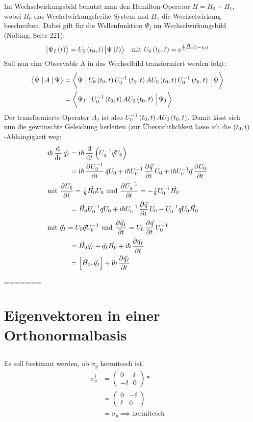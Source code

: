 Im Wechselwirkungsbild benutzt man den Hamilton-Operator $H=H_0+H_1$, wobei $H_0$ das Wechelwirkungsfreihe System und $H_1$ die Wechselwirkung beschreiben. Dabei gilt für die Wellenfunktion $\Psi_I$ im Wechselwirkungsbild (Nolting, Seite 221):
\begin{align*}
	\ket{\Psi_I\del{t}}=U_0\del{t_0,t}\ket{\Psi\del{t}}&&\text{mit }U_0\del{t_0,t}=\ee^{\frac{\ii}{\hbar}\vec{H}_0\del{t-t_0}}
\end{align*}
Soll nun eine Observable A in das Wechselbild transformiert werden folgt:
\begin{align*}
	\braopket{\Psi}{A}{\Psi}&=\braopket{\Psi}{U_0\del{t_0,t}U_0^{-1}\del{t_0,t}AU_0\del{t_0,t}U_0^{-1}\del{t_0,t}}{\Psi}\\
	&=\braopket{\Psi_I}{U_0^{-1}\del{t_0,t}AU_0\del{t_0,t}}{\Psi_I}\\
\end{align*}
Der transformierte Operator $A_I$ ist also $U_0^{-1}\del{t_0,t}AU_0\del{t_0,t}$. Damit lässt sich nun die gewünschte Geleichung herleiten (zur Übersichtlichkeit lasse ich die $\del{t_0,t}$-Abhängigkeit weg:
\begin{align*}
	\ii\hbar\dod{}{t}\vec{q}_I&=\ii\hbar\dod{}{t}\del{U_0^{-1}\vec{q}U_0}\\
	&=\ii\hbar\dpd{U_0^{-1}}{t}\vec{q}U_0+\ii\hbar U_0^{-1}\dpd{\vec{q}}{t}U_0+\ii\hbar U_0^{-1}\vec{q}\dpd{U_0}{t}\\
	\intertext{%
		mit $\dpd{U_0}{t}=\frac{\ii}{\hbar}\vec{H}_0U_0$ und $\dpd{U_0^{-1}}{t}=-\frac{\ii}{\hbar}U_0^{-1}\vec{H}_0$
	}
	&=\vec{H}_0U_0^{-1}\vec{q}U_0+\ii\hbar U_0^{-1}\dpd{\vec{q}}{t}U_0-U_0^{-1}\vec{q}U_0\vec{H}_0\\
	\intertext{%
		mit $\vec{q}_I=U_0\vec{q}U_0^{-1}$ und $\dpd{\vec{q}_I}{t}=U_0\dpd{\vec{q}}{t}U_0^{-1}$
	}
	&=\vec{H}_0\vec{q}_I-\vec{q}_I\vec{H}_0+\ii\hbar\dpd{\vec{q}_I}{t}\\
	&=\left[\vec{H}_0,\vec{q}_I\right]+\ii\hbar\dpd{\vec{q}_I}{t}
\end{align*}


=======
\section{Eigenvektoren in einer Orthonormalbasis}
\subsection{}
Es soll bestimmt werden, ob $\sigma_y$ hermitesch ist.
\begin{align*}
    \sigma^\dagger_y &= 
    \begin{pmatrix}
        0 &\ii \\
        -\ii &0
    \end{pmatrix}* \\
    &= \begin{pmatrix}
        0 &-\ii \\
        \ii &0
    \end{pmatrix} \\
    &= \sigma_y \implies \text{hermitesch}
\end{align*}


